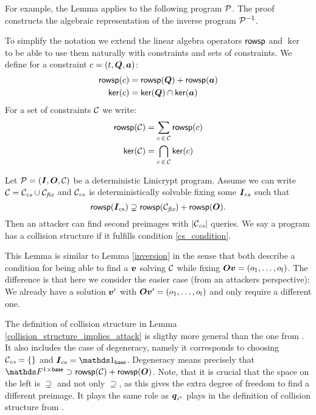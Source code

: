 For example, the Lemma applies to the following program $\P$. 
The proof constructs the algebraic representation of the inverse program $\P^{-1}$.
\begin{pchstack}[center,space=2cm]
\end{pchstack}

To simplify the notation we extend the linear algebra operators $\rowsp$ and $\ker$
to be able to use them naturally with constraints and sets of constraints.
We define for a constraint $c = (t, \Q, \va)$:
\begin{align*}
\rowsp(c) &= \rowsp(\Q) + \rowsp(\va) \\
\ker(c) &= \ker(\Q) \cap \ker(\va)
\end{align*}
For a set of constraints $\C$ we write:
\begin{align*}
\rowsp(\C) &= \sum_{c \, \in \, \C} \rowsp(c) \\
\ker(\C) &= \bigcap_{c \, \in \, \C} \ker(c)
\end{align*}

\begin{lemma}
\label{collision_structure_implies_attack}
    Let $\P = (\I, \O, \C)$ be a deterministic Linicrypt program.
    Assume we can write $\C = \Ccs \cup \Cfix$ and
    $\Ccs$ is deterministically solvable fixing some $\I_{cs}$ such that
    \begin{equation}
    \label{cs_condition}
        \rowsp(\I_\textrm{cs}) \supsetneq \rowsp(\Cfix) + \rowsp(\O).
    \end{equation}
    Then an attacker can find second preimages with $|\Ccs|$ queries.
    We say a program has a collision structure if it fulfills condition \eqref{cs_condition}.
\end{lemma}

This Lemma is similar to Lemma \ref{inversion} in the sense that both describe a condition for being able to find a $\vv$ solving $\C$ while fixing $\O\vv = \vec o l$.
The difference is that here we consider the easier case (from an attackers perspective):
We already have a solution $\vv'$ with $\O \vv' = \vec o l$ and only require a different one. 

The definition of collision structure in Lemma \ref{collision_structure_implies_attack}
is sligthy more general than the one from \cite{TCC:McQSwoRos19}.
It also includes the case of degeneracy, 
namely it corresponds to choosing $\Ccs = \{\}$ and $\I_\textrm{cs} = \Id_\base$.
Degeneracy means precisely that $\F^{1\times\base} \supset \rowsp(\C) + \rowsp(\O)$.
Note, that it is crucial that the space on the left is $\supsetneq$ and not only $\supseteq$,
as this gives the extra degree of freedom to find a different preimage.
It plays the same role as $\vq_{i^*}$ plays in the definition of collision structure from \cite{TCC:McQSwoRos19}.

